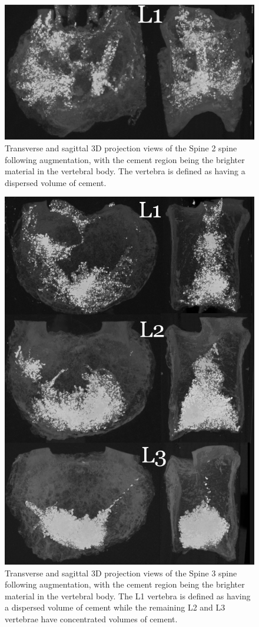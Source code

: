 \begin{figure}[h!]
  \centering
  \includegraphics[width=.65\textwidth]{Chapters/Chapter_HT_images/G19-11_projections}
	\caption{Transverse and sagittal 3D projection views of the Spine 2 spine following augmentation, with the cement region being the brighter material in the vertebral body. The vertebra is defined as having a dispersed volume of cement.}
  \label{fig:Spine 2_projection}
\end{figure}

\begin{figure}[h!]
  \centering
  \includegraphics[width=.65\textwidth]{Chapters/Chapter_HT_images/G21-11_projections}
	\caption{Transverse and sagittal 3D projection views of the Spine 3 spine following augmentation, with the cement region being the brighter material in the vertebral body. The L1 vertebra is defined as having a dispersed volume of cement while the remaining L2 and L3 vertebrae have concentrated volumes of cement.}
  \label{fig:Spine 3_projection}
\end{figure}

